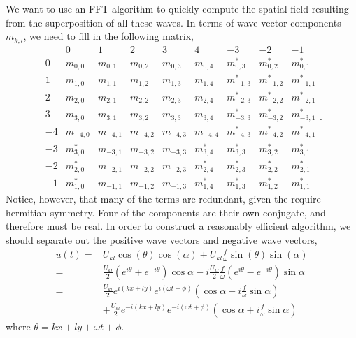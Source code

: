\documentclass[11pt]{article}
\begin{document}
We want to use an FFT algorithm to quickly compute the spatial field resulting from the superposition of all these waves. In terms of wave vector components $m_{k,l}$, we need to fill in the following matrix,
\begin{equation}
\begin{array}{c|ccccc|ccc} & 0 & 1 & 2 & 3 & 4 & -3 & -2 & -1 \\ \hline
0 & m_{0,0} & m_{0,1} & m_{0,2} & m_{0,3} & m_{0,4} & m_{0,3}^\ast & m_{0,2}^\ast & m_{0,1}^\ast \\
1 & m_{1,0} & m_{1,1} & m_{1,2} & m_{1,3} & m_{1,4} & m_{-1,3}^\ast & m_{-1,2}^\ast & m_{-1,1}^\ast \\
2 & m_{2,0} & m_{2,1} & m_{2,2} & m_{2,3} & m_{2,4} & m_{-2,3}^\ast & m_{-2,2}^\ast & m_{-2,1}^\ast \\
3 & m_{3,0} & m_{3,1} & m_{3,2} & m_{3,3} & m_{3,4} & m_{-3,3}^\ast & m_{-3,2}^\ast & m_{-3,1}^\ast \\
-4 & m_{-4,0} & m_{-4,1} & m_{-4,2} & m_{-4,3} & m_{-4,4} & m_{-4,3}^\ast & m_{-4,2}^\ast & m_{-4,1}^\ast \\
-3 & m_{3,0}^\ast & m_{-3,1} & m_{-3,2} & m_{-3,3} & m_{3,4}^\ast & m_{3,3}^\ast & m_{3,2}^\ast & m_{3,1}^\ast \\
-2 & m_{2,0}^\ast & m_{-2,1} & m_{-2,2} & m_{-2,3} & m_{2,4}^\ast & m_{2,3}^\ast & m_{2,2}^\ast & m_{2,1}^\ast \\
-1 & m_{1,0}^\ast & m_{-1,1} & m_{-1,2} & m_{-1,3} & m_{1,4}^\ast & m_{1,3}^\ast & m_{1,2}^\ast & m_{1,1}^\ast\end{array}.
\end{equation}
Notice, however, that many of the terms are redundant, given the require hermitian symmetry. Four of the components are their own conjugate, and therefore must be real. In order to construct a reasonably efficient algorithm, we should separate out the positive wave vectors and negative wave vectors,
\begin{align}
u(t) =& U_{kl} \cos( \theta ) \cos( \alpha) + U_{kl} \frac{f}{\omega} \sin( \theta ) \sin(\alpha) \\
=& \frac{U_{kl}}{2} \left( e^{i\theta} + e^{-i \theta} \right) \cos \alpha - i \frac{U_{kl}}{2} \frac{f}{\omega} \left( e^{i \theta} - e^{-i\theta} \right) \sin \alpha \\
=& \frac{U_{kl}}{2} e^{i(kx+ly)} e^{i(\omega t + \phi)} \left( \cos \alpha - i \frac{f}{\omega} \sin \alpha \right)  \\ \nonumber
&+ \frac{U_{kl}}{2} e^{-i(kx+ly)} e^{-i(\omega t + \phi)} \left( \cos \alpha + i \frac{f}{\omega} \sin \alpha \right) 
\end{align}
where $\theta = kx + ly + \omega t + \phi$.
\end{document}
